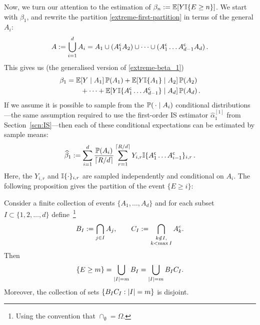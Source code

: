 Now, we turn our attention to the estimation of $\beta_n := \operatorname{{\mathbb E}}[ Y \mathbb{I}\{  E \ge n \} ]$.
We start with $\beta_1$, and rewrite the partition \eqref{extreme-first-partition} in terms of the general $A_i$:
\begin{align} \label{first-partition}
A := \bigcup_{i=1}^d A_i = A_1 \cup (A_1^{\mathsf{c}} A_2) \cup \dots \cup (A_1^{\mathsf{c}} \dots A_{d-1}^{\mathsf{c}} A_d ) \,.
\end{align}
This gives us (the generalised version of \eqref{extreme-beta_1})
\begin{align*}
  \beta_1 &= \operatorname{{\mathbb E}}[Y \mid A_1] \operatorname{{\mathbb P}}(A_1) + \operatorname{{\mathbb E}}[Y \mathbb{I}\{ A_1 \} \mid A_2] \operatorname{{\mathbb P}}(A_2) \\
  & \qquad + \dots + \operatorname{{\mathbb E}}[Y \mathbb{I}\{ A_1^{\mathsf{c}} \dots A_{d-1}^{\mathsf{c}} \} \mid A_d] \operatorname{{\mathbb P}}(A_d) \,.
\end{align*}
If we assume it is possible to sample from the $\operatorname{{\mathbb P}}(\,\cdot \mid A_i)$ conditional distributions---the same assumption required to use the first-order IS estimator $\hat{\alpha}_{1}^{[1]}$ from Section~\ref{scn:IS}---then each of these conditional expectations can be estimated by sample means:
\begin{align} \label{est-beta_1}
	\widehat{\beta}_1 := \sum_{i=1}^d \frac{\operatorname{{\mathbb P}}(A_i)}{\lceil R/d \rceil} \sum_{r=1}^{\lceil R/d \rceil}
	Y_{i,r} \mathbb{I}\{ A_1^{\mathsf{c}} \dots A_{i-1}^{\mathsf{c}} \}_{i,r} \,.
\end{align}
Here, the $Y_{i,r}$ and $\mathbb{I}\{ \cdot \}_{i,r}$ are sampled independently and conditional on $A_i$.
The following proposition gives the partition of the event $\{E \ge i\}$:

\begin{proposition}\label{Prop.Partition}
 Consider a finite collection of events $\{A_1,\dots,A_d\}$ and for each subset
 $I\subset\{1,2,\dots,d\}$ define~\footnote{Using the convention that $\cap_\emptyset=\Omega$.}
   \begin{equation*}
    B_I:=\bigcap_{j\in I} A_j,\qquad
    C_I:=\bigcap_{\substack{k\notin I,\\k<\max I}} A_k^c.
 \end{equation*}
 Then
 \begin{equation}\label{eq.partition}
  \{E\ge m\}=\bigcup_{\lvert I\rvert=m} B_I = \bigcup_{\lvert I\rvert=m} B_I C_I.
 \end{equation}
 Moreover, the collection of sets $\{B_IC_I:\lvert I\rvert=m\}$ is disjoint.
\end{proposition}

